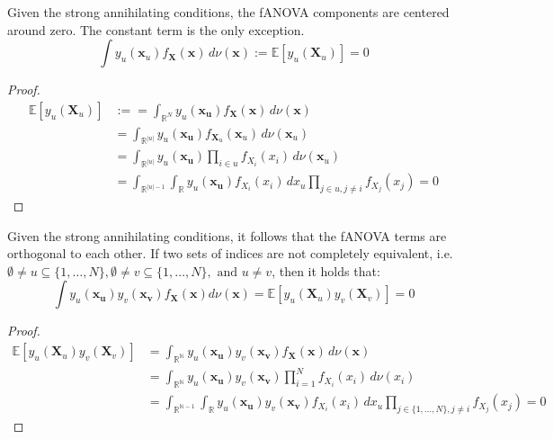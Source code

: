 \begin{proposition}
    Given the strong annihilating conditions, the fANOVA components are centered around zero. The constant term is the only exception.
\begin{equation}
    \int y_u(\boldsymbol{x}_u) f_{\boldsymbol{X}}(\boldsymbol{x}) \, d\nu (\boldsymbol{x}) := \mathbb{E}[y_u(\boldsymbol{X}_u)] = 0
    \label{eq:zero_mean_c}
\end{equation}
\end{proposition}
\begin{proof}
\begin{align*}
    \mathbb{E}[y_u(\boldsymbol{X}_u)] &:= = \int_{\mathbb{R}^{N}} y_u(\boldsymbol{x_u}) f_{\boldsymbol{X}}(\boldsymbol{x}) \, d\nu (\boldsymbol{x}) \\
    &= \int_{\mathbb{R}^{|u|}} y_u(\boldsymbol{x_u}) f_{\boldsymbol{X}_u}(\boldsymbol{x}_u) \, d\nu (\boldsymbol{x}_u) \\
    &= \int_{\mathbb{R}^{|u|}} y_u(\boldsymbol{x_u}) \prod_{i \in u} f_{X_i}(x_i) \, d\nu (\boldsymbol{x}_u) \\
    &= \int_{\mathbb{R}^{|u|-1}} \int_{\mathbb{R}} y_u(\boldsymbol{x_u}) f_{X_i}(x_i) \, dx_u \prod_{j \in u, j \neq i} f_{X_j}(x_j) = 0
\end{align*}
\end{proof}

\begin{proposition}
    Given the strong annihilating conditions, it follows that the fANOVA terms are orthogonal to each other. If two sets of indices are not completely equivalent, i.e. $\emptyset \neq u \subseteq \{1, \dots, N\}, \emptyset \neq v \subseteq \{1, \dots, N\}, \text{ and } u \neq v$, then it holds that:
\begin{equation}
    \int y_u(\boldsymbol{x_u}) y_v(\boldsymbol{x_v}) f_{\boldsymbol{X}}(\boldsymbol{x}) d\nu (\boldsymbol{x}) = \mathbb{E}[y_u(\boldsymbol{X}_u) y_v(\boldsymbol{X}_v)] = 0
    \label{eq:orthogonality_c}
\end{equation}
\end{proposition}

\begin{proof}
    \begin{align*}
    \mathbb{E}[y_u(\boldsymbol{X}_u) y_v(\boldsymbol{X}_v)] &= \int_{\mathbb{R}^{\mathbb{N}}} y_u(\boldsymbol{x_u}) y_v(\boldsymbol{x_v}) f_{\boldsymbol{X}}(\boldsymbol{x}) \, d\nu (\boldsymbol{x}) \\
    &= \int_{\mathbb{R}^{\mathbb{N}}} y_u(\boldsymbol{x_u}) y_v(\boldsymbol{x_v}) \prod_{i=1}^{N} f_{X_i}(x_i) \, d\nu (x_i) \\
    &= \int_{\mathbb{R}^{\mathbb{N}-1}} \int_{\mathbb{R}} y_u(\boldsymbol{x_u}) y_v(\boldsymbol{x_v}) f_{X_i}(x_i) \, dx_u \prod_{j \in \{1, \dots, N\}, j \neq i} f_{X_j}(x_j) = 0
\end{align*}
\end{proof}

